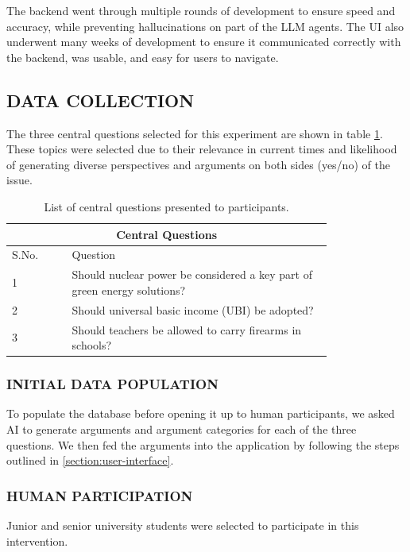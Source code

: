 \documentclass[journal]{IEEEtran}
\begin{document}
The backend went through multiple rounds of development to ensure speed and accuracy, while preventing hallucinations on part of the LLM agents. The UI also underwent many weeks of development to ensure it communicated correctly with the backend, was usable, and easy for users to navigate.

\subsection{DATA COLLECTION}
\label{section:data-collection}
The three central questions selected for this experiment are shown in table \ref{tab:central_questions}. These topics were selected due to their relevance in current times and likelihood of generating diverse perspectives and arguments on both sides (yes/no) of the issue.

\begin{table}[ht]
    \centering
    \begin{tabular}{p{0.15\linewidth}  p{0.65\linewidth}}
        \hline
        \multicolumn{2}{c}{\textbf{Central Questions}} \\
        \hline
        S.No.    & Question \\
        \hline
        1        & Should nuclear power be considered a key part of green energy solutions?\\
        2        & Should universal basic income (UBI) be adopted?            \\
        3        & Should teachers be allowed to carry firearms in schools?             \\
        \hline
    \end{tabular}
    \caption{List of central questions presented to participants.}
    \label{tab:central_questions}
\end{table}

\subsubsection{INITIAL DATA POPULATION}
\label{section:initial-data-population}
To populate the database before opening it up to human participants, we asked AI to generate arguments and argument categories for each of the three questions. We then fed the arguments into the application by following the steps outlined in \ref{section:user-interface}.

\subsubsection{HUMAN PARTICIPATION}
\label{section:human-participation}
Junior and senior university students were selected to participate in this intervention. 
\end{document}
